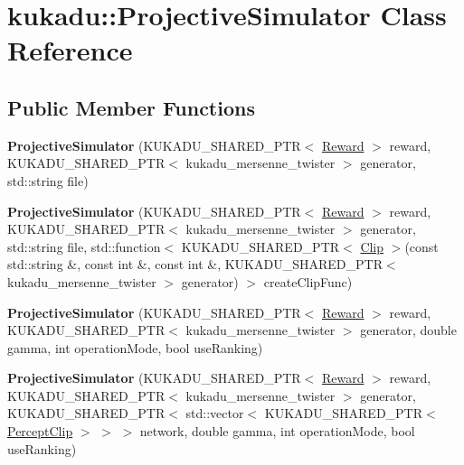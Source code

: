 \hypertarget{classkukadu_1_1ProjectiveSimulator}{\section{kukadu\-:\-:Projective\-Simulator Class Reference}
\label{classkukadu_1_1ProjectiveSimulator}
}
\subsection*{Public Member Functions}
\begin{DoxyCompactItemize}
\item 
\hypertarget{classkukadu_1_1ProjectiveSimulator_a5ab38c1c4ddc848435ef268154a68964}{{\bfseries Projective\-Simulator} (K\-U\-K\-A\-D\-U\-\_\-\-S\-H\-A\-R\-E\-D\-\_\-\-P\-T\-R$<$ \hyperlink{classkukadu_1_1Reward}{Reward} $>$ reward, K\-U\-K\-A\-D\-U\-\_\-\-S\-H\-A\-R\-E\-D\-\_\-\-P\-T\-R$<$ kukadu\-\_\-mersenne\-\_\-twister $>$ generator, std\-::string file)}\label{classkukadu_1_1ProjectiveSimulator_a5ab38c1c4ddc848435ef268154a68964}

\item 
\hypertarget{classkukadu_1_1ProjectiveSimulator_af2a9a8b46a43939fc551c9a6d2ebac2d}{{\bfseries Projective\-Simulator} (K\-U\-K\-A\-D\-U\-\_\-\-S\-H\-A\-R\-E\-D\-\_\-\-P\-T\-R$<$ \hyperlink{classkukadu_1_1Reward}{Reward} $>$ reward, K\-U\-K\-A\-D\-U\-\_\-\-S\-H\-A\-R\-E\-D\-\_\-\-P\-T\-R$<$ kukadu\-\_\-mersenne\-\_\-twister $>$ generator, std\-::string file, std\-::function$<$ K\-U\-K\-A\-D\-U\-\_\-\-S\-H\-A\-R\-E\-D\-\_\-\-P\-T\-R$<$ \hyperlink{classkukadu_1_1Clip}{Clip} $>$(const std\-::string \&, const int \&, const int \&, K\-U\-K\-A\-D\-U\-\_\-\-S\-H\-A\-R\-E\-D\-\_\-\-P\-T\-R$<$ kukadu\-\_\-mersenne\-\_\-twister $>$ generator) $>$ create\-Clip\-Func)}\label{classkukadu_1_1ProjectiveSimulator_af2a9a8b46a43939fc551c9a6d2ebac2d}

\item 
\hypertarget{classkukadu_1_1ProjectiveSimulator_aa7f5285814bf9a4a630a8b3e62483cd3}{{\bfseries Projective\-Simulator} (K\-U\-K\-A\-D\-U\-\_\-\-S\-H\-A\-R\-E\-D\-\_\-\-P\-T\-R$<$ \hyperlink{classkukadu_1_1Reward}{Reward} $>$ reward, K\-U\-K\-A\-D\-U\-\_\-\-S\-H\-A\-R\-E\-D\-\_\-\-P\-T\-R$<$ kukadu\-\_\-mersenne\-\_\-twister $>$ generator, double gamma, int operation\-Mode, bool use\-Ranking)}\label{classkukadu_1_1ProjectiveSimulator_aa7f5285814bf9a4a630a8b3e62483cd3}

\item 
\hypertarget{classkukadu_1_1ProjectiveSimulator_aa9bfdf6524f30d1f1e3e3c9c1094d59f}{{\bfseries Projective\-Simulator} (K\-U\-K\-A\-D\-U\-\_\-\-S\-H\-A\-R\-E\-D\-\_\-\-P\-T\-R$<$ \hyperlink{classkukadu_1_1Reward}{Reward} $>$ reward, K\-U\-K\-A\-D\-U\-\_\-\-S\-H\-A\-R\-E\-D\-\_\-\-P\-T\-R$<$ kukadu\-\_\-mersenne\-\_\-twister $>$ generator, K\-U\-K\-A\-D\-U\-\_\-\-S\-H\-A\-R\-E\-D\-\_\-\-P\-T\-R$<$ std\-::vector$<$ K\-U\-K\-A\-D\-U\-\_\-\-S\-H\-A\-R\-E\-D\-\_\-\-P\-T\-R$<$ \hyperlink{classkukadu_1_1PerceptClip}{Percept\-Clip} $>$ $>$ $>$ network, double gamma, int operation\-Mode, bool use\-Ranking)}\label{classkukadu_1_1ProjectiveSimulator_aa9bfdf6524f30d1f1e3e3c9c1094d59f}


\end{DoxyCompactItemize}

